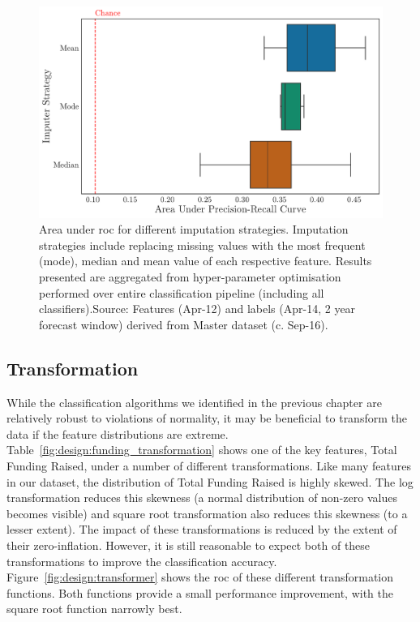 \documentclass[../thesis/thesis.tex]{subfiles}
\begin{document}
\begin{figure}[!htb]
    \centering
    \includegraphics[width=\textwidth]{../figures/design/imputer}
    \caption[Area under PR Curves by imputation strategy]{Area under \gls{roc} for different imputation strategies. Imputation strategies include replacing missing values with the most frequent (mode), median and mean value of each respective feature. Results presented are aggregated from hyper-parameter optimisation performed over entire classification pipeline (including all classifiers).Source: Features (Apr-12) and labels (Apr-14, 2 year forecast window) derived from Master dataset (c. Sep-16).}
    \label{fig:design:imputer}
\end{figure}

\subsection{Transformation}

While the classification algorithms we identified in the previous chapter are relatively robust to violations of normality, it may be beneficial to transform the data if the feature distributions are extreme. Table~\ref{fig:design:funding_transformation} shows one of the key features, Total Funding Raised, under a number of different transformations. Like many features in our dataset, the distribution of Total Funding Raised is highly skewed. The log transformation reduces this skewness (a normal distribution of non-zero values becomes visible) and square root transformation also reduces this skewness (to a lesser extent). The impact of these transformations is reduced by the extent of their zero-inflation. However, it is still reasonable to expect both of these transformations to improve the classification accuracy. Figure~\ref{fig:design:transformer} shows the \gls{roc} of these different transformation functions. Both functions provide a small performance improvement, with the square root function narrowly best.
\end{document}
